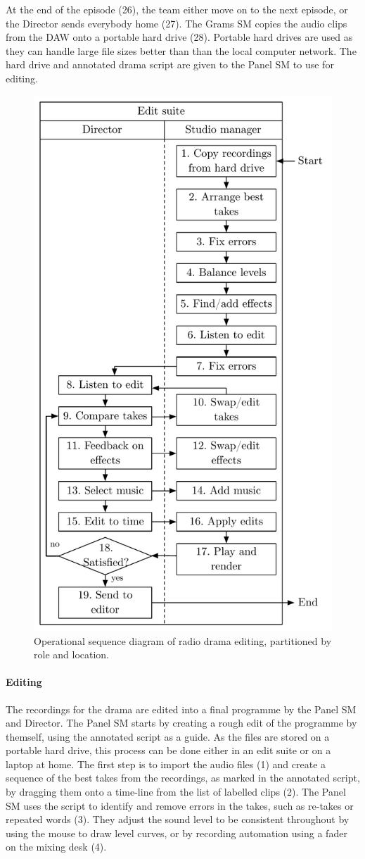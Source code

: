 At the end of the episode (26), the team either move on to the next episode, or the Director sends everybody home (27).
The Grams SM copies the audio clips from the DAW onto a portable hard drive (28).  Portable hard drives are used as
they can handle large file sizes better than than the local computer network.  The hard drive and annotated drama
script are given to the Panel SM to use for editing.

\begin{figure}
  \centering
  \includegraphics[width=.6\columnwidth]{figs/drama-editing-workflow.pdf}
  \caption{Operational sequence diagram of radio drama editing, partitioned by role and location.}
  \label{fig:ethno-drama-editing}
\end{figure}

\paragraph{Editing}
The recordings for the drama are edited into a final programme by the Panel SM and Director. The Panel SM starts by
creating a rough edit of the programme by themself, using the annotated script as a guide.  As the files are stored on
a portable hard drive, this process can be done either in an edit suite or on a laptop at home. The first step is to
import the audio files (1) and create a sequence of the best takes from the recordings, as marked in the annotated
script, by dragging them onto a time-line from the list of labelled clips (2).  The Panel SM uses the script to
identify and remove errors in the takes, such as re-takes or repeated words (3).  They adjust the sound level to be
consistent throughout by using the mouse to draw level curves, or by recording automation using a fader on the mixing
desk (4).

